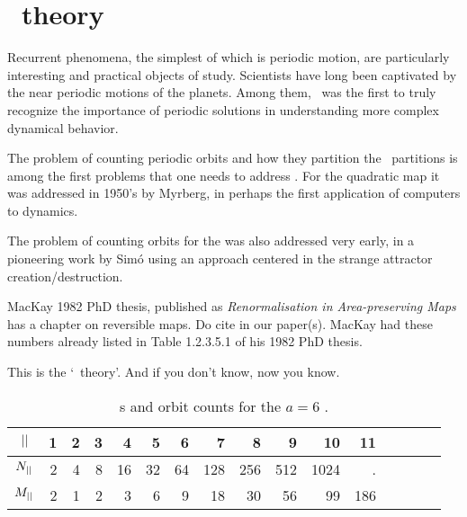 
\section{\Po\ theory}
\label{s:zeta1D}

Recurrent phenomena, the
simplest of which is periodic motion, are particularly interesting and
practical objects of study. Scientists have long been captivated by the
near periodic motions of the planets. Among them, \Poincare\ was the first
to truly recognize the importance of periodic solutions in understanding
more complex dynamical behavior.

The problem of counting periodic orbits and how they partition
the \statesp\ partitions is among the
first problems that one needs to address%
.
For
the quadratic map it was addressed in 1950's by
 {Myrberg}, in perhaps
the first application of computers to
dynamics.

The problem of counting orbits for the
{\HenonMap} was also addressed very early, in a pioneering work by
Sim{\'o} using an approach centered in the strange attractor
creation/destruction.

MacKay 1982 PhD thesis, published as
{\em Renormalisation in Area-preserving Maps} has a chapter on
reversible maps. Do cite in our paper(s).
MacKay had these numbers already
listed in Table 1.2.3.5.1 of his 1982 PhD thesis.

This is the `\po\ theory'. And if you don't know,
 {now you know}.

\begin{table}
\begin{tabular}{c|rrrrr|rrrrr|rrrrr}
${||}$ &  1 &  2 &  3 &  4 &  5 &
       6 &  7 &  8 &  9 & 10 &
      11 \\%
\hline
$N_{||}$ &  2 &  4 &  8 & 16 &  32 &
       64 &  128 &  256 & 512 & 1024 &
      . %
             \rule[-1ex]{0ex}{3.5ex} \\
$M_{||}$ &   2 &   1 &   2 &  3 &  6 &
         9 & 18 &  30 & 56  & 99 &
       186 &  %
\end{tabular}
\bigskip
\caption{\label{tab:LC21HamHenon}
{\Lattstate}s and %
orbit counts for the ${a}=6$ {\HenonMap}.
}
\end{table}
%

